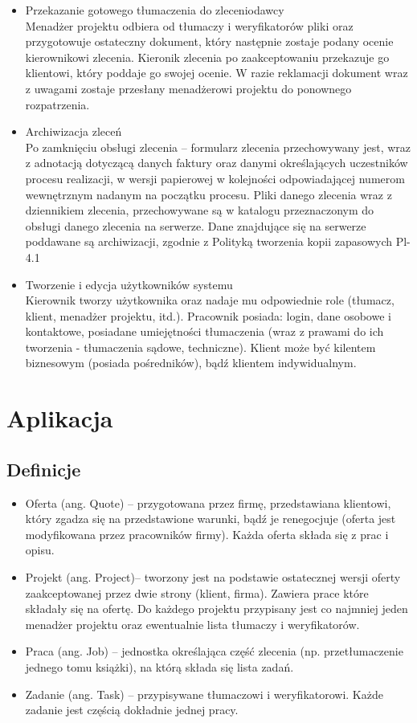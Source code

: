 \documentclass[licencjacka]{pracamgr}
\begin{document}
\begin{itemize}
\item Przekazanie gotowego tłumaczenia do zleceniodawcy\\
Menadżer projektu odbiera od tłumaczy i weryfikatorów pliki oraz przygotowuje ostateczny dokument, który następnie zostaje podany ocenie kierownikowi zlecenia.
Kieronik zlecenia po zaakceptowaniu przekazuje go klientowi, który poddaje go swojej ocenie. W razie reklamacji dokument wraz z uwagami zostaje przesłany 
menadżerowi projektu do ponownego rozpatrzenia.

\item Archiwizacja zleceń\\
Po zamknięciu obsługi zlecenia – formularz zlecenia przechowywany jest,
wraz z adnotacją dotyczącą danych faktury oraz danymi określających uczestników 
procesu realizacji, w wersji papierowej w kolejności odpowiadającej numerom 
wewnętrznym nadanym na początku procesu.
Pliki danego zlecenia wraz z dziennikiem zlecenia, przechowywane są w 
katalogu przeznaczonym do obsługi danego zlecenia na serwerze.
Dane znajdujące się na serwerze poddawane są archiwizacji, zgodnie z 
Polityką tworzenia kopii zapasowych Pl-4.1

\item Tworzenie i edycja użytkowników systemu\\
Kierownik tworzy użytkownika oraz nadaje mu odpowiednie role (tłumacz, klient, menadżer projektu, itd.).
Pracownik posiada: login, dane osobowe i kontaktowe, posiadane umiejętności tłumaczenia (wraz z prawami do ich tworzenia - tłumaczenia sądowe, techniczne).
Klient może być kilentem biznesowym (posiada pośredników), bądź klientem indywidualnym.

\end{itemize}

\chapter{Aplikacja}

\section{Definicje}
\begin{itemize}
\item Oferta (ang. Quote) – przygotowana przez firmę, przedstawiana klientowi, który zgadza się na przedstawione warunki, bądź je renegocjuje (oferta jest modyfikowana przez pracowników firmy). Każda oferta składa się z prac i opisu.
\item Projekt (ang. Project)– tworzony jest na podstawie ostatecznej wersji oferty zaakceptowanej przez dwie strony (klient, firma). Zawiera prace które składały się na ofertę. Do każdego projektu przypisany jest co najmniej jeden menadżer projektu oraz ewentualnie lista tłumaczy i weryfikatorów.
\item Praca (ang. Job) – jednostka określająca część zlecenia (np. przetłumaczenie jednego tomu książki), na którą składa się lista zadań.
\item Zadanie (ang. Task) – przypisywane tłumaczowi i weryfikatorowi. Każde zadanie jest częścią dokładnie jednej pracy.
\end{itemize}
\end{document}
